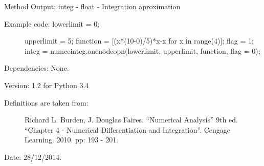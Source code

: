 \documentclass[letterpaper,10pt,oneside]{sphinxmanual}
\theoremstyle{plain}%
\theoremstyle{definition}%
\theoremstyle{remark}%
\begin{document}
Method Output: integ - float - Integration aproximation
\begin{description}
\item[{Example code: lowerlimit = 0;}] \leavevmode
upperlimit = 5;
function = {[}(x*(10-0)/5)*x-x for x in range(4){]};
flag = 1;
integ =                   numecinteg.onenodeopn(lowerlimit, upperlimit, function, flag = 0);

\end{description}

Dependencies: None.

Version: 1.2 for Python 3.4
\begin{description}
\item[{Definitions are taken from:}] \leavevmode
Richard L. Burden, J. Douglas Faires. ``Numerical Analysis'' 9th ed.
``Chapter 4 - Numerical Differentiation and Integration''. 
Cengage Learning. 2010. pp: 193 - 201.

\end{description}




Date: 28/12/2014.
\end{document}
